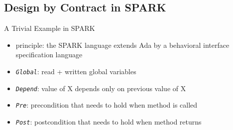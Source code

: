 \subsection{Design by Contract in SPARK}
\begin{frame}{\insertsubsection}
	\begin{fancycolumns}[widths={33}]
		\begin{exampletight}{A Trivial Example in SPARK}
			\centering\makebox{\usebox{\sparkincrement}}
		\end{exampletight}
		\nextcolumn
		\begin{definition}{\insertsubsection{} \mysource{\introtospark}}
			\begin{itemize}
				\item principle: the SPARK language extends Ada by a behavioral interface specification language
				\item \emph{\lstinline|Global|}: read + written global variables
				\item \emph{\lstinline|Depend|}: value of X depends only on previous value of X
				\item \emph{\lstinline|Pre|}: precondition that needs to hold when method is called
				\item \emph{\lstinline|Post|}: postcondition that needs to hold when method returns
			\end{itemize}
		\end{definition}
	\end{fancycolumns}
\end{frame}



